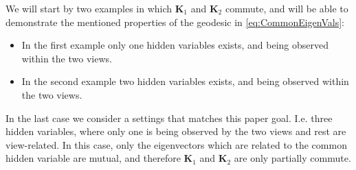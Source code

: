 \documentclass[]{article}
\theoremstyle{definition}
\begin{document}
	We will start by two examples in which $\mathbf{K}_1$ and $\mathbf{K}_2$ commute, and will be able to demonstrate the mentioned properties of the geodesic in \ref{eq:CommonEigenVals}:
	\begin{itemize}
		\item In the first example  only one hidden variables exists, and being observed within the two views. 
		\item In the second example two hidden variables exists, and being observed within the two views. 
	\end{itemize}
	In the last case we consider a settings that matches this paper goal. I.e. three hidden variables, where only one is being observed by the two views and rest are view-related. In this case, only the eigenvectors which are related to the common hidden variable are mutual, and therefore $\mathbf{K}_1$ and $\mathbf{K}_2$ are only partially commute.
	
\end{document}
